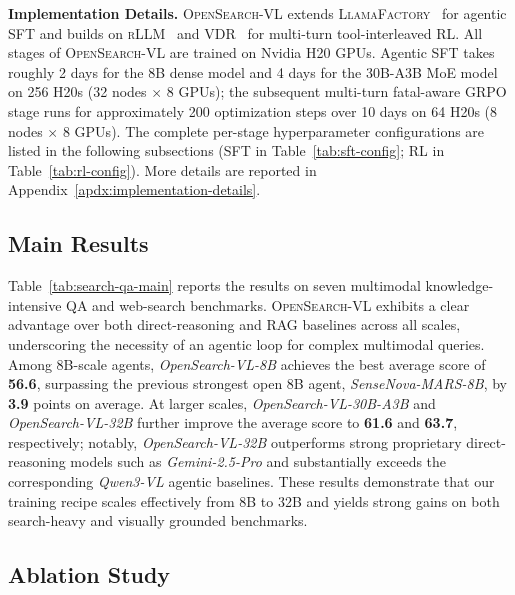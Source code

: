 \textbf{Implementation Details.}
\textsc{OpenSearch-VL} extends \textsc{LlamaFactory}~\citep{zheng2024llamafactory} for agentic SFT and builds on \textsc{rLLM}~\citep{rllm2025} and \textsc{VDR}~\citep{huang2026vision} for multi-turn tool-interleaved RL. All stages of \textsc{OpenSearch-VL} are trained on Nvidia H20 GPUs. Agentic SFT takes roughly 2 days for the 8B dense model and 4 days for the 30B-A3B MoE model on 256 H20s (32 nodes $\times$ 8 GPUs); the subsequent multi-turn fatal-aware GRPO stage runs for approximately 200 optimization steps over 10 days on 64 H20s (8 nodes $\times$ 8 GPUs). The complete per-stage hyperparameter configurations are listed in the following subsections (SFT in Table~\ref{tab:sft-config}; RL in Table~\ref{tab:rl-config}). More details are reported in Appendix~\ref{apdx:implementation-details}.



\subsection{Main Results}




Table~\ref{tab:search-qa-main} reports the results on seven multimodal knowledge-intensive QA and web-search benchmarks. \textsc{OpenSearch-VL} exhibits a clear advantage over both direct-reasoning and RAG baselines across all scales, underscoring the necessity of an agentic loop for complex multimodal queries. Among 8B-scale agents, \textit{OpenSearch-VL-8B} achieves the best average score of \textbf{56.6}, surpassing the previous strongest open 8B agent, \textit{SenseNova-MARS-8B}, by \textbf{3.9} points on average. At larger scales, \textit{OpenSearch-VL-30B-A3B} and \textit{OpenSearch-VL-32B} further improve the average score to \textbf{61.6} and \textbf{63.7}, respectively; notably, \textit{OpenSearch-VL-32B} outperforms strong proprietary direct-reasoning models such as \textit{Gemini-2.5-Pro} and substantially exceeds the corresponding \textit{Qwen3-VL} agentic baselines. These results demonstrate that our training recipe scales effectively from 8B to 32B and yields strong gains on both search-heavy and visually grounded benchmarks.







\subsection{Ablation Study}

